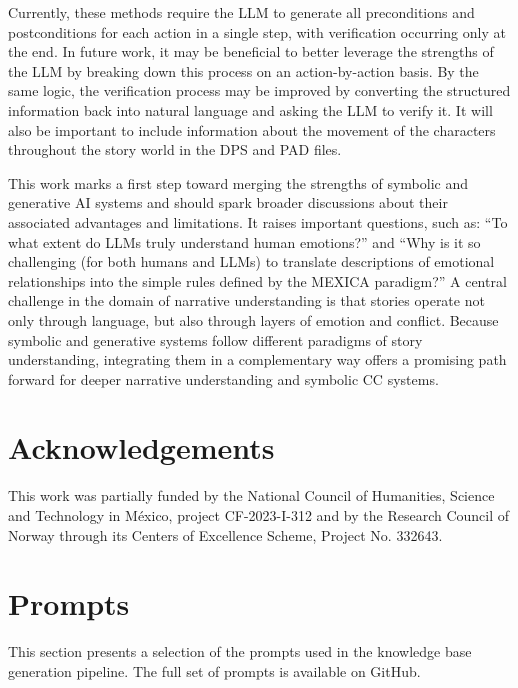 \documentclass[phd,electronic,oneside,twosidetoc,letterpaper,chaptercenter,parttop,lof]{byumsphd}
\begin{document}
Currently, these methods require the LLM to generate all preconditions and postconditions for each action in a single step, with verification occurring only at the end. In future work, it may be beneficial to better leverage the strengths of the LLM by breaking down this process on an action-by-action basis. By the same logic, the verification process may be improved by converting the structured information back into natural language and asking the LLM to verify it. It will also be important to include information about the movement of the characters throughout the story world in the DPS and PAD files. 

This work marks a first step toward merging the strengths of symbolic and generative AI systems and should spark broader discussions about their associated advantages and limitations. It raises important questions, such as: ``To what extent do LLMs truly understand human emotions?” and ``Why is it so challenging (for both humans and LLMs) to translate descriptions of emotional relationships into the simple rules defined by the MEXICA paradigm?” A central challenge in the domain of narrative understanding is that stories operate not only through language, but also through layers of emotion and conflict. Because symbolic and generative systems follow different paradigms of story understanding, integrating them in a complementary way offers a promising path forward for deeper narrative understanding and symbolic CC systems.

\section{Acknowledgements}
This work was partially funded by the National Council of Humanities, Science and Technology in México, project CF-2023-I-312 and by the Research Council of Norway through its Centers of Excellence Scheme, Project No. 332643.


\section{Prompts}

This section presents a selection of the prompts used in the knowledge base generation pipeline. The full set of prompts is available on GitHub.
\end{document}
